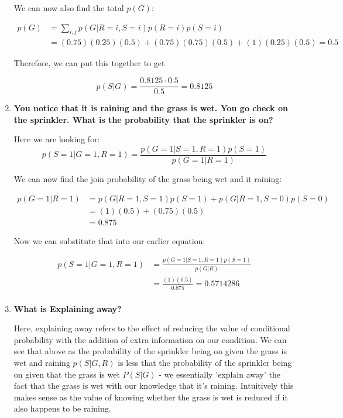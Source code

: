 \documentclass[submit]{harvardml}
\begin{document}
\begin{enumerate}
    We can now also find the total $p(G)$: 
    
    \begin{align*}
        p(G) &= \sum_{i,j} p(G| R = i, S = i)p(R=i)p(S=i) \\
        &= (0.75)(0.25)(0.5) + (0.75)(0.75)(0.5) + (1)(0.25)(0.5) = 0.5
    \end{align*}
    
    Therefore, we can put this together to get 
    
    $$
    p(S | G) = \frac{0.8125 \cdot 0.5}{0.5} = 0.8125
    $$
    
    \item \textbf{You notice that it is raining and the grass is wet. You go check on the sprinkler.  What is the probability that the sprinkler is on?}
    
    Here we are looking for: 
    $$
        p(S=1 | G = 1, R = 1) = \frac{p(G=1 | S=1, R = 1)p(S=1)}{p(G=1|R=1)}
    $$
    
    We can now find the join probability of the grass being wet and it raining:
    
    \begin{align*}
        p(G=1| R=1) &= p(G|R=1,S=1)p(S=1) + p(G|R=1,S=0)p(S=0)\\
        &= (1)(0.5) + (0.75)(0.5)\\
        &= 0.875
    \end{align*}
    
    Now we can substitute that into our earlier equation:
    
    \begin{align*}
        p(S=1 | G = 1, R = 1) &= \frac{p(G=1 | S=1, R = 1)p(S=1)}{p(G|R)} \\
        &= \frac{(1)(0.5)}{0.875} =  0.5714286\\
    \end{align*}
    
    
    \item \textbf{What is Explaining away?}
    
    Here, explaining away refers to the effect of reducing the value of conditional probability with the addition of extra information on our condition. We can see that above as the probability of the sprinkler being on given the grass is wet and raining $p(S | G,R)$ is less that the probability of the sprinkler being on given that the grass is wet $P(S|G)$ - we essentially 'explain away' the fact that the grass is wet with our knowledge that it's raining. Intuitively this makes sense as the value of knowing whether the grass is wet is reduced if it also happens to be raining.
    
    
\end{enumerate}
\end{document}
